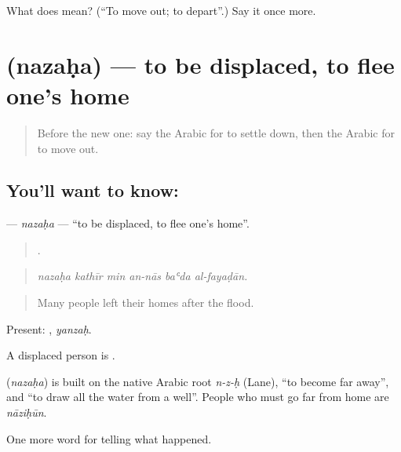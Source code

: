\begin{tcolorbox}[breakable,colback=teal!4,colframe=teal!35!black,title={Before you move on}]
What does  mean? (\textquotedblleft{}To move out; to depart\textquotedblright{}.) Say it once more.
\end{tcolorbox}
\section[\texorpdfstring{\ar{نزح} (nazaḥa)}{نزح (nazaḥa)}]{ (nazaḥa) — to be displaced, to flee one’s home}

\label{lesson:AR-C332-nazaha}



\begin{quote}
Before the new one: say the Arabic for to settle down, then the Arabic for to move out.
\end{quote}

\subsection*{You'll want to know: }
\textbf{} — \emph{nazaḥa} — \textquotedblleft{}to be displaced, to flee one’s home\textquotedblright{}.

\begin{quote}
     .
\end{quote}

\begin{quote}
\emph{nazaḥa kathīr min an-nās baʿda al-fayaḍān.}
\end{quote}

\begin{quote}
Many people left their homes after the flood.
\end{quote}

Present: , \emph{yanzaḥ}.

A displaced person is .

\begin{cousinweb}
\textbf{} (\emph{nazaḥa}) is built on the native Arabic root \emph{n-z-ḥ} (Lane), \textquotedblleft{}to become far away\textquotedblright{}, and \textquotedblleft{}to draw all the water from a well\textquotedblright{}. People who must go far from home are \emph{nāziḥūn}.
\end{cousinweb}

\begin{grammarlens}[title={What you've built}]
One more word for telling what happened.
\end{grammarlens}

